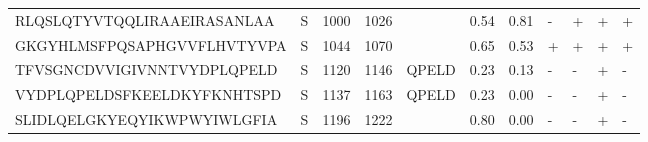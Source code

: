 \begin{tabular}{llrrlrrllll}
RLQSLQTYVTQQLIRAAEIRASANLAA &       S &   1000 &  1026 &                     &            0.54 &             0.81 &      - &       + &      + &       + \\
GKGYHLMSFPQSAPHGVVFLHVTYVPA &       S &   1044 &  1070 &                     &            0.65 &             0.53 &      + &       + &      + &       + \\
TFVSGNCDVVIGIVNNTVYDPLQPELD &       S &   1120 &  1146 &               QPELD &            0.23 &             0.13 &      - &       - &      + &       - \\
VYDPLQPELDSFKEELDKYFKNHTSPD &       S &   1137 &  1163 &               QPELD &            0.23 &             0.00 &      - &       - &      + &       - \\
SLIDLQELGKYEQYIKWPWYIWLGFIA &       S &   1196 &  1222 &                     &            0.80 &             0.00 &      - &       - &      + &       - \\
\bottomrule
\end{tabular}
